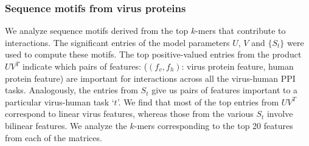 \documentclass{bioinfo}
\begin{document}







\subsubsection{Sequence motifs from virus proteins}
We analyze sequence motifs derived from the top $k$-mers that contribute to interactions. The significant entries of the model parameters $U$, $V$ and $\{S_t\}$ were used to 
compute these motifs. The top positive-valued entries from the product $U V^T$ indicate which pairs of features: ($(f_v, f_h)$: virus protein feature, human protein feature) are important for interactions across all the virus-human PPI tasks.
Analogously, the entries from $S_t$ give us pairs of features important to a particular virus-human task `$t$'.
We find that most of the top entries from $U V^T$ correspond to linear virus features, whereas those from the various $S_t$
involve bilinear features. We analyze the $k$-mers corresponding to the top 20 features from each of the matrices.
\end{document}
